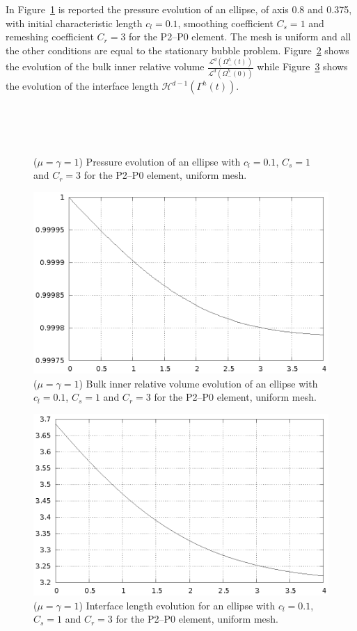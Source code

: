 \documentclass[a4paper,12pt,onecolumn]{article}
\begin{document}
In Figure~\ref{fig:ellipse} is reported the pressure evolution of an ellipse, of axis 0.8 and 0.375, with initial characteristic length $c_l=0.1$, smoothing coefficient $C_s=1$ and remeshing coefficient $C_r=3$ for the P2--P0 element. The mesh is uniform and all the other conditions are equal to the stationary bubble problem. Figure~\ref{fig:ellipse_bulk_inner_volume} shows the evolution of the bulk inner relative volume $\frac{\mathcal{L}^d(\Omega^h_-(t))}{\mathcal{L}^d(\Omega^h_-(0))}$ while Figure~\ref{fig:ellipse_interface_length} shows the evolution of the interface length $\mathcal{H}^{d-1}(\Gamma^h(t))$.
\begin{figure}[htbp]
  \centering
  \\
  \quad
  \\
  \quad
  \\
  \caption{($\mu=\gamma=1$) Pressure evolution of an ellipse with $c_l=0.1$, $C_s=1$ and $C_r=3$ for the P2--P0 element, uniform mesh.}
  \label{fig:ellipse}
\end{figure}

\begin{figure}[htbp]
  \centering
  \includegraphics[width=.45\textwidth]{images/ellipse_bulk_inner_volume.ps}
  \caption{($\mu=\gamma=1$) Bulk inner relative volume evolution of an ellipse with $c_l=0.1$, $C_s=1$ and $C_r=3$ for the P2--P0 element, uniform mesh.}
  \label{fig:ellipse_bulk_inner_volume}
\end{figure}

\begin{figure}[htbp]
  \centering
  \includegraphics[width=.45\textwidth]{images/ellipse_interface_length.ps}
  \caption{($\mu=\gamma=1$) Interface length evolution for an ellipse with $c_l=0.1$, $C_s=1$ and $C_r=3$ for the P2--P0 element, uniform mesh.}
  \label{fig:ellipse_interface_length}
\end{figure}
\end{document}
